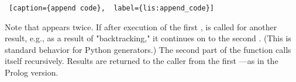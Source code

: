 \begin{itemize}
\begin{minipage}{\linewidth}
\begin{python}
\end{python}
\begin{lstlisting} [caption={append code},  label={lis:append_code}]
\end{lstlisting}
\end{minipage}

Note that  appears twice. If after execution of the first ,  is called for another result, e.g., as a result of "backtracking," it continues on to the second . (This is standard behavior for Python generators.) The second part of the function calls itself recursively. Results are returned to the caller from the first ---as in the Prolog version. 
\end{itemize}

